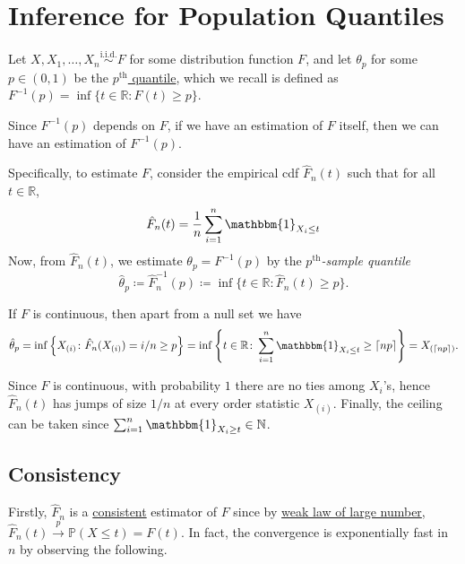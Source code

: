 \section{Inference for Population Quantiles}
Let \(X, X_1, \dots , X_n \overset{\text{i.i.d.} }{\sim } F\) for some distribution function \(F\), and let \(\theta _p\) for some \(p \in (0, 1)\) be the \hyperref[def:quantile-function]{\(p^{\text{th} }\) quantile}, which we recall is defined as \(F^{-1} (p) = \inf \{ t \in \mathbb{R} \colon F(t) \geq p \} \).

\begin{intuition}
	Since \(F^{-1} (p)\) depends on \(F\), if we have an estimation of \(F\) itself, then we can have an estimation of \(F^{-1} (p)\).
\end{intuition}

Specifically, to estimate \(F\), consider the empirical cdf \(\hat{F} _n(t)\) such that for all \(t \in \mathbb{R} \),
\[
	\hat{F} _n(t) = \frac{1}{n} \sum_{i=1}^{n} \mathbbm{1}_{X_i \leq t}
\]
Now, from \(\hat{F} _n(t)\), we estimate \(\theta _p = F^{-1} (p)\) by the \emph{\(p^{\text{th} }\)-sample quantile}
\[
	\hat{\theta} _p
	\coloneqq \hat{F} _n ^{-1} (p)
	\coloneqq \inf \{ t \in \mathbb{R} \colon \hat{F} _n(t) \geq p \}.
\]

\begin{remark}
	If \(F\) is continuous, then apart from a null set we have
	\[
		\hat{\theta} _p
		= \inf \left\{ X_{(i)} \colon \hat{F} _n(X_{(i)}) = i / n \geq p \right\}
		= \inf \left\{ t \in \mathbb{R} \colon \sum_{i=1}^{n} \mathbbm{1}_{X_i \leq t} \geq \lceil np \rceil \right\}
		= X_{(\lceil np \rceil )}.
	\]
\end{remark}
\begin{explanation}
	Since \(F\) is continuous, with probability \(1\) there are no ties among \(X_i\)'s, hence \(\hat{F} _n(t)\) has jumps of size \(1 / n\) at every order statistic \(X_{(i)}\). Finally, the ceiling can be taken since \(\sum_{i=1}^{n} \mathbbm{1}_{X_i \geq t} \in \mathbb{N} \).
\end{explanation}

\subsection{Consistency}
Firstly, \(\hat{F} _n\) is a \hyperref[def:consistent]{consistent} estimator of \(F\) since by \hyperref[thm:WLLN]{weak law of large number}, \(\hat{F} _n(t) \overset{p}{\to} \mathbb{P} (X \leq t) = F(t)\). In fact, the convergence is exponentially fast in \(n\) by observing the following.

